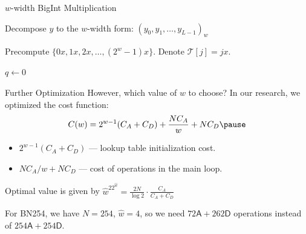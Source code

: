 \documentclass{zkdl-presentation-template}
\begin{document}
    \begin{frame}{$w$-width BigInt Multiplication}
        \begin{algorithm}[H]
          \caption{Double-and-add method for integer multiplication}\label{alg:double_and_add}
          
          Decompose $y$ to the $w$-width form: $(y_0,y_1,\dots,y_{L-1})_w$

          Precompute $\{0x, 1x, 2x, \dots, (2^w-1)x\}$. Denote $\mathcal{T}[j]=jx$.
          
          $q \gets 0$
          
          
          
        \end{algorithm}
    \end{frame}

    \begin{frame}{Further Optimization}
        However, which value of $w$ to choose? In our research, we optimized 
        the cost function:
        \begin{equation*}
            C(w) = 2^{w-1}(C_A+C_D) + \frac{NC_A}{w} + NC_D\pause
        \end{equation*}
        \begin{itemize}
            \item $2^{w-1}(C_A+C_D)$ --- lookup table initialization cost.\pause
            \item $NC_A/w + NC_D$ --- cost of operations in the main loop.\pause
        \end{itemize}

        \begin{theorem}
            Optimal value is given by $\widehat{w}^22^{\widehat{w}} = \frac{2N}{\log 2} \cdot \frac{C_A}{C_A+C_D}$        
        \end{theorem}

        For BN254, we have $N=254$, $\widehat{w}=4$, so we need
        $72\mathsf{A}+262\mathsf{D}$ operations instead of
        $254\mathsf{A}+254\mathsf{D}$.
    \end{frame}
\end{document}
